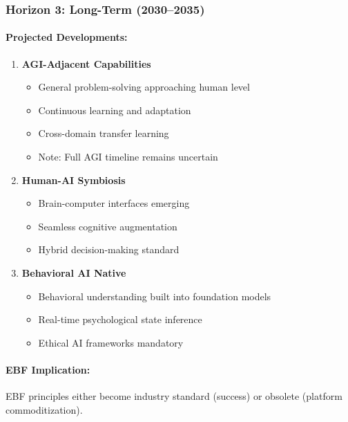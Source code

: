 \subsubsection{Horizon 3: Long-Term (2030--2035)}

\paragraph{Projected Developments:}
\begin{enumerate}
    \item \textbf{AGI-Adjacent Capabilities}
    \begin{itemize}
        \item General problem-solving approaching human level
        \item Continuous learning and adaptation
        \item Cross-domain transfer learning
        \item Note: Full AGI timeline remains uncertain
    \end{itemize}

    \item \textbf{Human-AI Symbiosis}
    \begin{itemize}
        \item Brain-computer interfaces emerging
        \item Seamless cognitive augmentation
        \item Hybrid decision-making standard
    \end{itemize}

    \item \textbf{Behavioral AI Native}
    \begin{itemize}
        \item Behavioral understanding built into foundation models
        \item Real-time psychological state inference
        \item Ethical AI frameworks mandatory
    \end{itemize}
\end{enumerate}

\paragraph{EBF Implication:} EBF principles either become industry standard
(success) or obsolete (platform commoditization).


